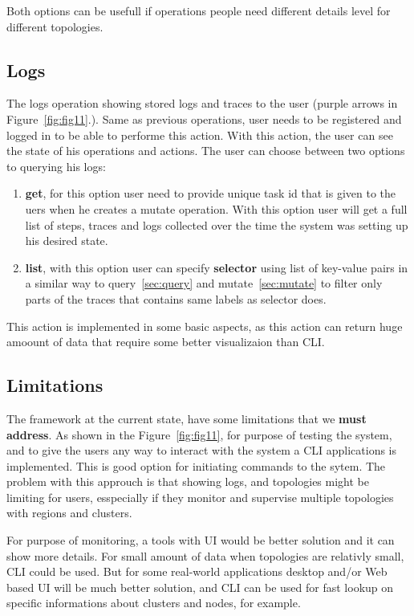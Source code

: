Both options can be usefull if operations people need different details level for different topologies. 
%
%
\subsection{Logs}\label{sec:logs}
% 
The logs operation showing stored logs and traces to the user (purple arrows in Figure~\ref{fig:fig11}.). Same as previous operations, user needs to be registered and logged in to be able to performe this action. With this action, the user can see the state of his operations and actions. The user can choose between two options to querying his logs:

\begin{enumerate}[start=1,label={(\bfseries \arabic*)}]
	\item \textbf{get}, for this option user need to provide unique task id that is given to the uers when he creates a mutate operation. With this option user will get a full list of steps, traces and logs collected over the time the system was setting up his desired state.  
	\item \textbf{list}, with this option user can specify \textbf{selector} using list of key-value pairs in a similar way to query~\ref{sec:query} and mutate~\ref{sec:mutate} to filter only parts of the traces that contains same labels as selector does.
\end{enumerate}

This action is implemented in some basic aspects, as this action can return huge amoount of data that require some better visualizaion than CLI.
%
%
\subsection{Limitations}\label{sec:framework_limits}
% 
The framework at the current state, have some limitations that we \textbf{must address}. As shown in the Figure~\ref{fig:fig11}, for purpose of testing the system, and to give the users any way to interact with the system a CLI applications is implemented. This is good option for initiating commands to the sytem. The problem with this approuch is that showing logs, and topologies might be limiting for users, esspecially if they monitor and supervise multiple topologies with regions and clusters.

For purpose of monitoring, a tools with UI would be better solution and it can show more details. For small amount of data when topologies are relativly small, CLI could be used. But for some real-world applications desktop and/or Web based UI will be much better solution, and CLI can be used for fast lookup on specific informations about clusters and nodes, for example.

